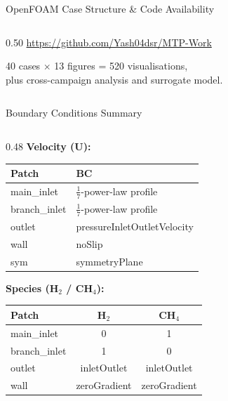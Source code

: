 \documentclass[10pt, aspectratio=169]{beamer}
\begin{document}
\begin{frame}[fragile]{OpenFOAM Case Structure \& Code Availability}
\begin{columns}[T]
\begin{column}{0.50\textwidth}
            \vspace{0.3em}
            \centering
            \url{https://github.com/Yash04dsr/MTP-Work}

            \vspace{0.5em}
            \flushleft
            {\small 40 cases $\times$ 13 figures = 520 visualisations,\\
            plus cross-campaign analysis and surrogate model.}
        \end{column}
    \end{columns}
\end{frame}

\begin{frame}{Boundary Conditions Summary}
    \small
    \begin{columns}[T]
        \begin{column}{0.48\textwidth}
            \textbf{Velocity (U):}
            \begin{table}
                \centering\scriptsize
                \begin{tabular}{@{}ll@{}}
                    \toprule
                    \textbf{Patch} & \textbf{BC} \\
                    \midrule
                    main\_inlet & $\tfrac{1}{7}$-power-law profile \\
                    branch\_inlet & $\tfrac{1}{7}$-power-law profile \\
                    outlet & pressureInletOutletVelocity \\
                    wall & noSlip \\
                    sym & symmetryPlane \\
                    \bottomrule
                \end{tabular}
            \end{table}

            \vspace{0.2em}
            \textbf{Species (H$_2$ / CH$_4$):}
            \begin{table}
                \centering\scriptsize
                \begin{tabular}{@{}lcc@{}}
                    \toprule
                    \textbf{Patch} & \textbf{H$_2$} & \textbf{CH$_4$} \\
                    \midrule
                    main\_inlet & 0 & 1 \\
                    branch\_inlet & 1 & 0 \\
                    outlet & inletOutlet & inletOutlet \\
                    wall & zeroGradient & zeroGradient \\
                    \bottomrule
                \end{tabular}
            \end{table}


\end{column}
\end{columns}
\end{frame}
\end{document}
